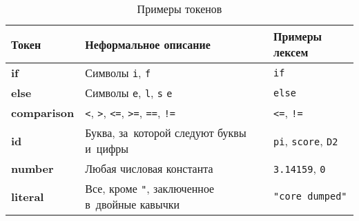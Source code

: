 \begin{table} [htbp]
	\centering
	\changecaptionwidth\captionwidth{15.2cm}
	\caption{Примеры токенов}\label{tokens}%
	\begin{tabular}{| p{3cm} | p{6cm} | p{5cm} |} \hline
		\textbf{Токен}		&	\textbf{Неформальное описание}												&	\textbf{Примеры лексем}						\\ \hline
		\textbf{if}  		& 	Символы \texttt{i}, \texttt{f} 												& 	\texttt{if} 								\\ \hline
		\textbf{else}  		& 	Символы \texttt{e}, \texttt{l}, \texttt{s} \texttt{e} 						& 	\texttt{else} 								\\ \hline
		\textbf{comparison}	& 	\texttt{<}, \texttt{>}, \texttt{<=}, \texttt{>=}, \texttt{==}, \texttt{!=}	& 	\texttt{<=}, \texttt{!=} 					\\ \hline
		\textbf{id}  		& 	Буква, за~которой следуют буквы и~цифры										& 	\texttt{pi}, \texttt{score}, \texttt{D2}	\\ \hline
		\textbf{number}  	& 	Любая числовая константа													& 	\texttt{3.14159}, \texttt{0} 				\\ \hline
		\textbf{literal}  	& 	Все, кроме \texttt{"}, заключенное в~двойные кавычки 						& 	\texttt{"core dumped"} 						\\ \hline	
	\end{tabular}
\end{table}